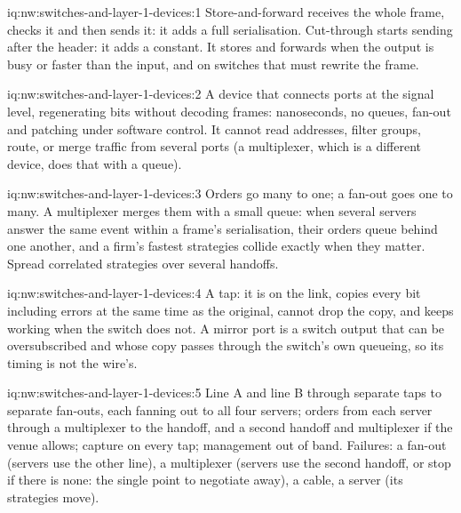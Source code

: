 \begin{solution}{iq:nw:switches-and-layer-1-devices:1}
Store-and-forward receives the whole frame, checks it and then sends it: it adds a full serialisation. Cut-through starts sending
after the header: it adds a constant. It stores and forwards when the output is busy or faster than the input, and on switches
that must rewrite the frame.
\end{solution}

\begin{solution}{iq:nw:switches-and-layer-1-devices:2}
A device that connects ports at the signal level, regenerating bits without decoding frames: nanoseconds, no queues, fan-out and
patching under software control. It cannot read addresses, filter groups, route, or merge traffic from several ports (a
multiplexer, which is a different device, does that with a queue).
\end{solution}

\begin{solution}{iq:nw:switches-and-layer-1-devices:3}
Orders go many to one; a fan-out goes one to many. A multiplexer merges them with a small queue: when several servers answer the same
event within a frame's serialisation, their orders queue behind one another, and a firm's fastest strategies collide exactly when
they matter. Spread correlated strategies over several handoffs.
\end{solution}

\begin{solution}{iq:nw:switches-and-layer-1-devices:4}
A tap: it is on the link, copies every bit including errors at the same time as the original, cannot drop the copy, and keeps
working when the switch does not. A mirror port is a switch output that can be oversubscribed and whose copy passes through the
switch's own queueing, so its timing is not the wire's.
\end{solution}

\begin{solution}{iq:nw:switches-and-layer-1-devices:5}
Line A and line B through separate taps to separate fan-outs, each fanning out to all four servers; orders from each server through
a multiplexer to the handoff, and a second handoff and multiplexer if the venue allows; capture on every tap; management out of band.
Failures: a fan-out (servers use the other line), a multiplexer (servers use the second handoff, or stop if there is none: the
single point to negotiate away), a cable, a server (its strategies move).
\end{solution}

